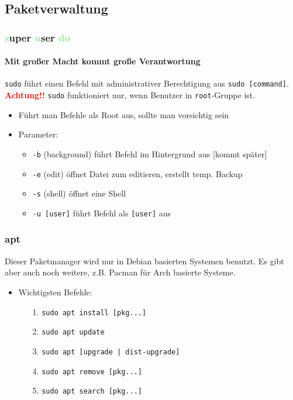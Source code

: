 \documentclass[12pt,utf8]{beamer}
\begin{document}
\subsection{Paketverwaltung}
\begin{frame}
	\frametitle{\textcolor{lightGreen}{s}uper \textcolor{lightGreen}{u}ser \textcolor{lightGreen}{do}}
	\framesubtitle{Mit großer Macht kommt große Verantwortung}
	\texttt{sudo} führt einen Befehl mit administrativer Berechtigung aus \texttt{sudo [command]}.
	\textbf{\textcolor{red}{Achtung!!}} \texttt{sudo} funktioniert nur, wenn Benutzer in \texttt{root}-Gruppe ist.
	\begin{itemize}
		\item Führt man Befehle als Root aus, sollte man vorsichtig sein
		\item Parameter:
		\begin{itemize}[<+->]
			\item {\scriptsize \texttt{-b} (background) führt Befehl im Hintergrund aus [kommt später]}
			\item {\scriptsize \texttt{-e} (edit) öffnet Datei zum editieren, erstellt temp. Backup}
			\item {\scriptsize \texttt{-s} (shell) öffnet eine Shell}
			\item {\scriptsize \texttt{-u [user]} führt Befehl als \texttt{[user]} aus}
		\end{itemize}
	\end{itemize}
\end{frame}

\begin{frame}
	\frametitle{apt}
	Dieser Paketmanager wird nur in Debian basierten Systemen benutzt. Es gibt aber auch noch weitere, z.B. Pacman für Arch basierte Systeme.
	\begin{itemize}
		\item Wichtigsten Befehle:
		\begin{itemize}
			\item[1.] \texttt{sudo apt install [pkg...]}
			\item[2.] \texttt{sudo apt update}
			\item[3.] \texttt{sudo apt [upgrade | dist-upgrade]}
			\item[4.] \texttt{sudo apt remove [pkg...]}
			\item[5.] \texttt{sudo apt search [pkg...]}
		\end{itemize}
	\end{itemize}
\end{frame}
\end{document}
